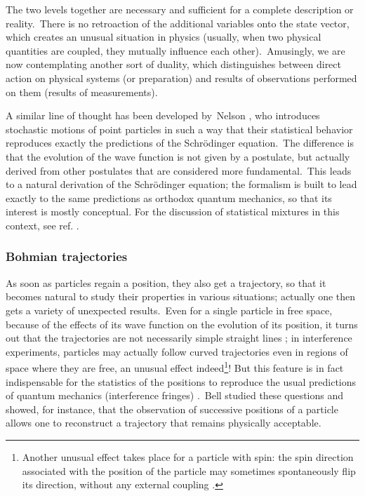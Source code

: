 \documentclass[12pt,onecolumn]{article}%
\begin{document}
The two levels together are necessary and sufficient for a complete
description or reality.\ There is no retroaction of the additional variables
onto the state vector, which creates an unusual situation in physics (usually,
when two physical quantities are coupled, they mutually influence each
other).\ Amusingly, we are now contemplating another sort of duality, which
distinguishes between direct action on physical systems (or preparation) and
results of observations performed on them (results of measurements).

A similar line of thought has been developed by\ Nelson \cite{Nelson}, who
introduces stochastic motions of point particles in such a way that their
statistical behavior reproduces exactly the predictions of the Schr\"{o}dinger
equation.\ The difference is that the evolution of the wave function is not
given by a postulate, but actually derived from other postulates that are
considered more fundamental.\ This leads to a natural derivation of the
Schr\"{o}dinger equation; the formalism is built to lead exactly to the same
predictions as orthodox quantum mechanics, so that its interest is mostly
conceptual. For the discussion of statistical mixtures in this context, see
ref. \cite{Werner}.

\subsubsection{Bohmian trajectories}

As soon as particles regain a position, they also get a trajectory, so that it
becomes natural to study their properties in various situations; actually one
then gets a variety of unexpected results.\ Even for a single particle in free
space, because of the effects of its wave function on the evolution of its
position, it turns out that the trajectories are not necessarily simple
straight lines \cite{trajectories}; in interference experiments, particles may
actually follow curved trajectories even in regions of space where they are
free, an unusual effect indeed\footnote{Another unusual effect takes place for
a particle with spin: the spin direction associated with the position of the
particle may sometimes spontaneously flip its direction, without any external
coupling \cite{Englert}.}! But this feature is in fact indispensable for the
statistics of the positions to reproduce the usual predictions of quantum
mechanics (interference fringes) \cite{Bell-Bohm}.\ Bell studied these
questions \cite{Bell-speakable} and showed, for instance, that the observation
of successive positions of a particle allows one to reconstruct a trajectory
that remains physically acceptable.
\end{document}
